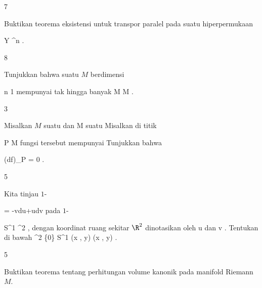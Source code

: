 {7}
{

Buktikan teorema eksistensi untuk transpor paralel pada suatu hiperpermukaan

\mavergleichskette
{\vergleichskette
{ Y
}
{ \subseteq }{ \R^n
}
{  }{
}
{    }{
}
{   }{
}
}
{}{}{.}

}
{} {}

{8}
{

Tunjukkan bahwa suatu
$M$ berdimensi

\mavergleichskette
{\vergleichskette
{ n
}
{ \geq }{ 1
}
{  }{
}
{    }{
}
{   }{
}
}
{}{}{}
mempunyai tak hingga banyak
\maabbdisp {\varphi} { M } { M
} {}
.

}
{} {}

{3}
{

Misalkan $M$ suatu
dan
 { M } {\R
} {}
suatu
Misalkan di titik

\mavergleichskette
{\vergleichskette
{ P
}
{ \in }{ M
}
{  }{
}
{    }{
}
{   }{
}
}
{}{}{}
fungsi tersebut mempunyai
Tunjukkan bahwa

\mavergleichskettedisp
{\vergleichskette
{ (df)_P
}
{ =} { 0
}
{ } {
}
{ } {
}
{ } {
}
}
{}{}{.}

}
{} {}

{5}
{

Kita tinjau
$1$-

\mavergleichskettedisp
{\vergleichskette
{ \omega
}
{ =} { -vdu+udv
}
{ } {
}
{ } {
}
{ } {
}
}
{}{}{}
pada
$1$-

\mavergleichskette
{\vergleichskette
{ S^1
}
{ \subset }{ \R^2
}
{  }{
}
{    }{
}
{   }{
}
}
{}{}{,}
dengan koordinat ruang sekitar $\R^2$ dinotasikan oleh
\mathkor {} {u} {dan} {v} {.}
Tentukan
\mathl{\pi^* \omega}{} di bawah
\maabbeledisp {\pi} {\R^2 \setminus \{0\}} { S^{1}
} {(x , y) } { {  } (x , y)
} {.}

}
{} {}

{5}
{

Buktikan teorema tentang perhitungan volume kanonik pada manifold Riemann $M$.

}
{} {}

